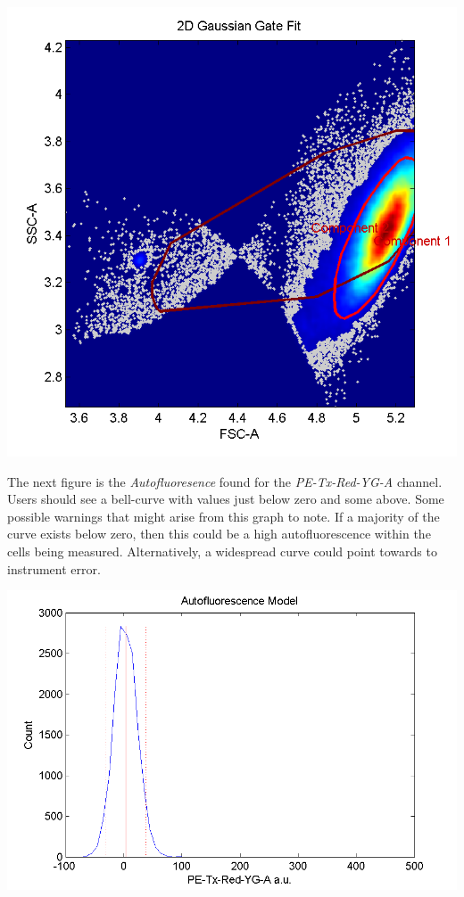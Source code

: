 \begin{center}
  \includegraphics[width=.90\textwidth]{figures/AutomaticGate-FSC-A-vs-SSC-A}
\end{center}

The next figure is the \textit{Autofluoresence} found for the \textit{PE-Tx-Red-YG-A} channel. Users should see a bell-curve with values just below zero and some above. Some possible warnings that might arise from this graph to note. If a majority of the curve exists below zero, then this could be a high autofluorescence within the cells being measured. Alternatively,  a widespread curve could point towards to instrument error. 

\begin{center}
  \includegraphics[width=.80\textwidth]{figures/autofluorescence-mKate}
\end{center}

